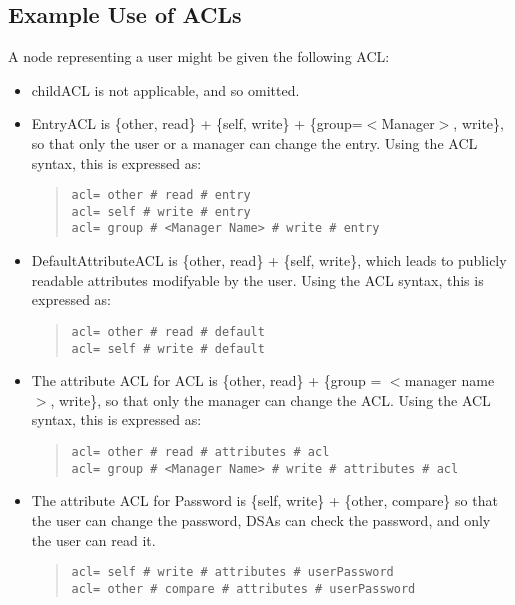 \subsection {Example Use of ACLs}

A node representing a user might be given the following ACL:

\begin{itemize}
\item
childACL is not applicable, and so omitted.
\item
EntryACL is \{other, read\} + \{self, write\} + \{group=$<$Manager$>$,
write\}, so that only the user or a manager can change the entry.
Using the ACL syntax, this is expressed as:
\begin{quote}\begin{verbatim}
acl= other # read # entry
acl= self # write # entry
acl= group # <Manager Name> # write # entry
\end{verbatim}\end{quote}
\item
DefaultAttributeACL is \{other, read\} + \{self, write\}, which leads to
publicly readable attributes modifyable by the user.
Using the ACL syntax, this is expressed as:
\begin{quote}\begin{verbatim}
acl= other # read # default
acl= self # write # default
\end{verbatim}\end{quote}
\item
The attribute ACL for ACL is \{other, read\} + \{group = $<$manager name$>$,
write\},  so that only the manager can change the ACL.
Using the ACL syntax, this is expressed as:
\begin{quote}\small\begin{verbatim}
acl= other # read # attributes # acl
acl= group # <Manager Name> # write # attributes # acl
\end{verbatim}\end{quote}
\item
The attribute ACL for Password is \{self, write\} + \{other, compare\} so that
the user can change the password, DSAs can check the password, and only
the user can read it.
\begin{quote}\begin{verbatim}
acl= self # write # attributes # userPassword
acl= other # compare # attributes # userPassword
\end{verbatim}\end{quote}
\end{itemize}

